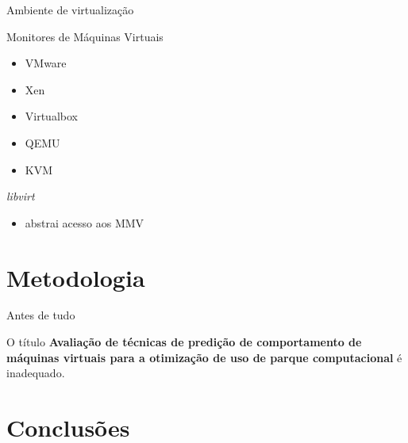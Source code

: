 \documentclass{beamer}
\begin{document}
\begin{frame}{Ambiente de virtualização}
\begin{figure}
\centering
%
%
\end{figure}
\end{frame}

\begin{frame}{Monitores de Máquinas Virtuais}
\begin{itemize}
  \item VMware
  \item Xen
  \item Virtualbox
  \item QEMU
  \item KVM
\end{itemize}
\end{frame}

\begin{frame}{\emph{libvirt}}
\begin{itemize}
  \item abstrai acesso aos MMV
\end{itemize}
\end{frame}


\section{Metodologia}
\begin{frame}{Antes de tudo}
\begin{block}{}
O título \textbf{Avaliação de técnicas de predição de comportamento de máquinas
virtuais para a otimização de uso de parque computacional} é inadequado.
\end{block}
\end{frame}

\section{Conclusões}
\end{document}
